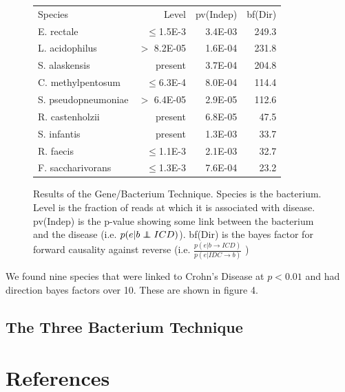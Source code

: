 \documentclass[a4paper]{article}
\newcommand\independent{\protect\mathpalette{\protect\independenT}{\perp}}
\def\independenT#1#2{\mathrel{\rlap{$#1#2$}\mkern2mu{#1#2}}}
\begin{document}
\begin{figure}[b]
  \begin{tabular}{@{}lrrr}
    Species & Level & pv(Indep) & bf(Dir) \\
E. rectale & $\leq$1.5E-3 & 3.4E-03 & 249.3\\
L. acidophilus & $>$ 8.2E-05 & 1.6E-04 & 231.8\\
S. alaskensis & present & 3.7E-04 & 204.8\\
C. methylpentosum & $\leq$6.3E-4 & 8.0E-04 & 114.4\\
S. pseudopneumoniae & $>$ 6.4E-05 & 2.9E-05 & 112.6\\
R. castenholzii & present & 6.8E-05 & 47.5\\
S. infantis & present & 1.3E-03 & 33.7\\
R. faecis & $\leq$1.1E-3 & 2.1E-03 & 32.7\\
F. saccharivorans & $\leq$1.3E-3 & 7.6E-04 & 23.2 \\
  \end{tabular}
  \caption{ Results of the Gene/Bacterium Technique.  Species is the
    bacterium.  Level is the fraction of reads at which it is
    associated with disease.  pv(Indep) is the p-value showing some link
    between the bacterium and the disease (i.e. $p(e|b\independent
    ICD)$).  bf(Dir) is the bayes factor for forward causality against
    reverse (i.e. 
    $\frac{p(e|b\rightarrow ICD)}{p(e|IDC\rightarrow b)}$ ) } 
\end{figure}

We found nine species that were linked to Crohn's Disease at $p<0.01$
and had direction bayes factors over 10.  These are shown in figure 4.

\subsection{The Three Bacterium Technique}

\section{References}
\end{document}
